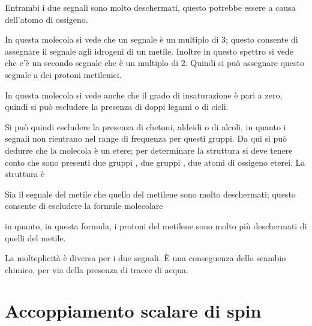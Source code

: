 Entrambi i due segnali sono molto deschermati, questo potrebbe essere a causa dell'atomo di ossigeno.


In questa molecola si vede che un segnale è un multiplo di 3; questo consente di assegnare il segnale agli idrogeni di un metile. Inoltre in questo spettro si vede che c'è un secondo segnale che è un multiplo di 2. Quindi si può assegnare questo segnale a dei protoni metilenici.


In questa molecola si vede anche che il grado di insaturazione è pari a zero, quindi si può escludere la presenza di doppi legami o di cicli.

Si può quindi escludere la presenza di chetoni, aldeidi o di alcoli, in quanto i segnali non rientrano nel range di frequenza per questi gruppi. Da qui si può dedurre che la molecola è un etere; per determinare la struttura si deve tenere conto che sono presenti due gruppi , due gruppi , due atomi di ossigeno eterei. La struttura è
\begin{center}
\end{center}

Sia il segnale del metile che quello del metilene sono molto deschermati; questo consente di escludere la formule molecolare
\begin{center}
\end{center}
in quanto, in questa formula, i protoni del metilene sono molto più deschermati di quelli del metile.

La molteplicità è diversa per i due segnali. È una conseguenza dello scambio chimico, per via della presenza di tracce di acqua.


\section{Accoppiamento scalare di spin}

